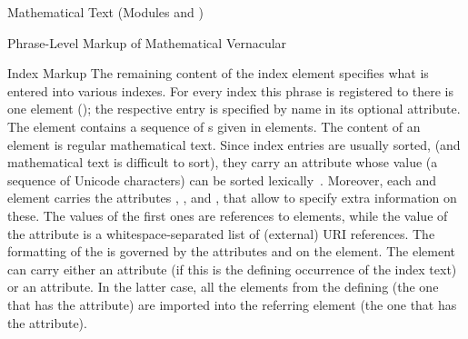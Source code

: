 \begin{tchapter}[id=mtxt,short=Mathematical Text]{Mathematical Text (Modules
   and )}
\begin{tsection}[id=phrases]{Phrase-Level Markup of Mathematical Vernacular}
\begin{tsubsection}{Index Markup}
The remaining content of the index element specifies what is entered into various
indexes. For every index this phrase is registered to there is one  element
(); the respective entry is specified by name in its optional
 attribute. The  element contains a sequence of
{s} given in {} elements. The content of an
 element is regular mathematical text. Since index entries are usually
sorted, (and mathematical text is difficult to sort), they carry an attribute
 whose value (a sequence of Unicode characters) can be sorted
lexically~\cite{Unicode:collation}. Moreover, each  and 
element carries the attributes , ,
and , that allow to specify extra information on these. The
values of the first ones are references to  elements, while the value of
the  attribute is a whitespace-separated list of (external) URI
references.  The formatting of the  is governed by the attributes
 and  on the  element. The
 element can carry either an  attribute
(if this is the defining occurrence of the index text) or an 
attribute. In the latter case, all the  elements from the defining
 (the one that has the  attribute) are
imported into the referring  element (the one that has the
 attribute).
\end{tsubsection}


\end{tsection}
\end{tchapter}
